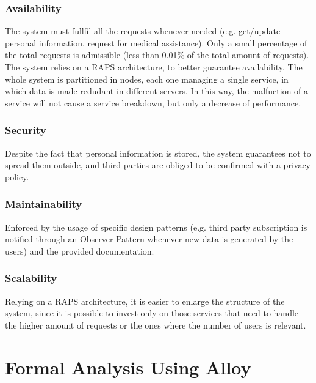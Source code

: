 \documentclass[12pt,a4paper]{article}
\begin{document}
	\subsubsection{Availability}
	The system must fullfil all the requests whenever needed (e.g. get/update personal information, request for medical assistance). Only a small percentage of the total requests is admissible (less than 0.01\% of the total amount of requests). The system relies on a RAPS architecture, to better guarantee availability. The whole system is partitioned in nodes, each one managing a single service, in which data is made redudant in different servers. In this way, the malfuction of a service will not cause a service breakdown, but only a decrease of performance.
	\subsubsection{Security}
	Despite the fact that personal information is stored, the system guarantees not to spread them outside, and third parties are obliged to be confirmed with a privacy policy.
	\subsubsection{Maintainability}
	Enforced by the usage of specific design patterns (e.g. third party subscription is notified through an Observer Pattern whenever new data is generated by the users) and the provided documentation.
	\subsubsection{Scalability}
	Relying on a RAPS architecture, it is easier to enlarge the structure of the system, since it is possible to invest only on those services that need to handle the higher amount of requests or the ones where the number of users is relevant.
	
	
	\newpage
	\section{Formal Analysis Using Alloy}

	\newpage
	
\end{document}
